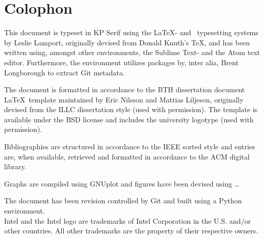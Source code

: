 
\chapter*{Colophon}
\label{cha:colophon}
This document is typeset in KP Serif using the \LaTeX - and \BibTeX\ typesetting systems by Leslie Lamport, originally devised from Donald Knuth's \TeX , and has been written using, amongst other environments, the Sublime Text- and the Atom text editor.
Furthermore, the environment utilizes packages by, inter alia, Brent Longborough to extract Git metadata.

The document is formatted in accordance to the BTH dissertation document \LaTeX\ template maintained by Eric Nilsson and Mattias Liljeson, originally devised from the ILLC dissertation style (used with permission).
The template is available under the BSD license and includes the university logotype (used with permission).

Bibliographies are structured in accordance to the IEEE sorted style and entries are, when available, retrieved and formatted in accordance to the ACM digital library.

Graphs are compiled using GNUplot and figures have been devised using \ldots\

The document has been revision controlled by Git and built using a Python environment.\\

\noindent
Intel and the Intel logo are trademarks of Intel Corporation in the U.S. and/or other countries.
All other trademarks are the property of their respective owners.






